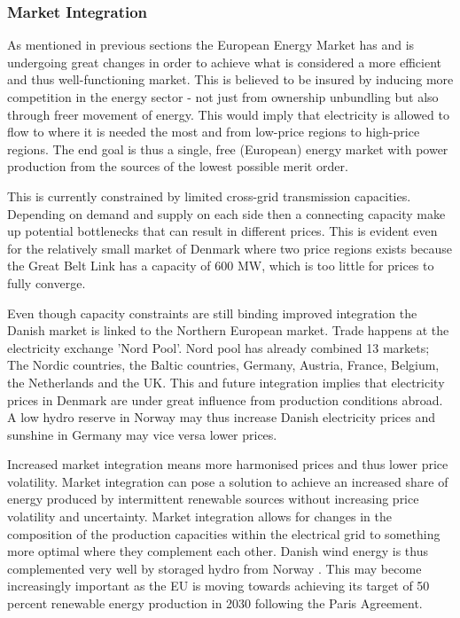\subsubsection{Market Integration}
\label{subsec:t_EU}
As mentioned in previous sections the European Energy Market has and is undergoing great changes in order to achieve what is considered a more efficient and thus well-functioning market. This is believed to be insured by inducing more competition in the energy sector - not just from ownership unbundling but also through freer movement of energy. This would imply that electricity is allowed to flow to where it is needed the most and from low-price regions to high-price regions. The end goal is thus a single, free (European) energy market with power production from the sources of the lowest possible merit order.
\par
This is currently constrained by limited cross-grid transmission capacities. Depending on demand and supply on each side then a connecting capacity make up potential bottlenecks that can result in different prices. %
This is evident even for the relatively small market of Denmark where two price regions exists because the Great Belt Link has a capacity of 600 MW, which is too little for prices to fully converge. \bigskip \par
Even though capacity constraints are still binding improved integration the Danish market is linked to the Northern European market. Trade happens at the electricity exchange 'Nord Pool'. Nord pool has already combined 13 markets; The Nordic countries, the Baltic countries, Germany, Austria, France, Belgium, the Netherlands and the UK.  This and future integration implies that electricity prices in Denmark are under great influence from production conditions abroad. A low hydro reserve in Norway may thus increase Danish electricity prices and sunshine in Germany may vice versa lower prices. \bigskip \par
Increased market integration means more harmonised prices and thus lower price volatility. Market integration can pose a solution to achieve an increased share of energy produced by intermittent renewable sources without increasing price volatility and uncertainty. Market integration allows for changes in the composition of the production capacities within the electrical grid to something more optimal where they complement each other. Danish wind energy is thus complemented very well by storaged hydro from Norway \citep{ambec2012electricity}.  This may become increasingly important as the EU is moving towards achieving its target of 50 percent renewable energy production in 2030 following the Paris Agreement.

